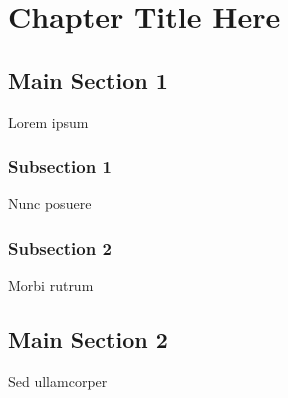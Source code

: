 
\chapter{Chapter Title Here} %

\label{ChapterX} %



\section{Main Section 1}

Lorem ipsum

\subsection{Subsection 1}

Nunc posuere 


\subsection{Subsection 2}
Morbi rutrum 


\section{Main Section 2}

Sed ullamcorper